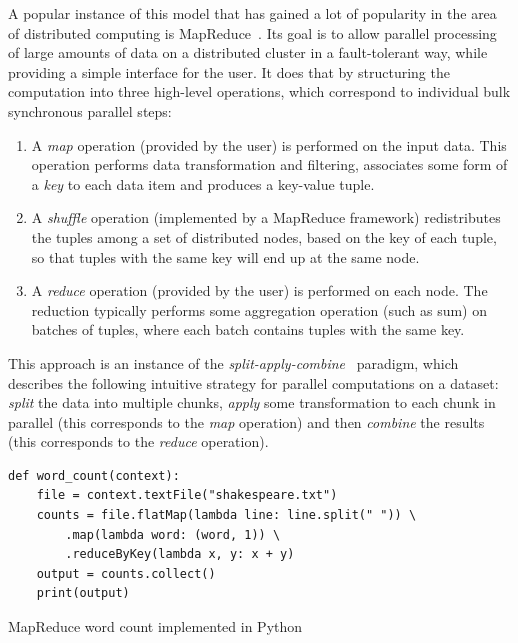 A popular instance of this model that has gained a lot of popularity in the area of distributed
computing is MapReduce~\cite{mapreduce}. Its goal is to allow parallel processing of large
amounts of data on a distributed cluster in a fault-tolerant way, while providing a simple
interface for the user. It does that by structuring the computation into three high-level
operations, which correspond to individual bulk synchronous parallel steps:
\begin{enumerate}
	\item A \emph{map} operation (provided by the user) is performed on the input data. This
	      operation performs data transformation and filtering, associates some form of a
	      \emph{key} to each data item and produces a key-value tuple.
	\item A \emph{shuffle} operation (implemented by a MapReduce framework) redistributes the tuples
	      among a set of distributed nodes, based on the key of each tuple, so that tuples with the same key
	      will end up at the same node.
	\item A \emph{reduce} operation (provided by the user) is performed on each node. The reduction
	      typically performs some aggregation operation (such as sum) on batches of tuples, where each batch
	      contains tuples with the same key.
\end{enumerate}

This approach is an instance of the \emph{split-apply-combine}~\cite{split_apply_combine} paradigm, which
describes the following intuitive strategy for parallel computations on a dataset:
\emph{split} the data into multiple chunks, \emph{apply} some transformation
to each chunk in parallel (this corresponds to the \emph{map} operation) and then
\emph{combine} the results (this corresponds to the \emph{reduce} operation).

\begin{listing}
	\begin{verbatim}
def word_count(context):
	file = context.textFile("shakespeare.txt")
	counts = file.flatMap(lambda line: line.split(" ")) \
		.map(lambda word: (word, 1)) \
		.reduceByKey(lambda x, y: x + y)
	output = counts.collect()
	print(output)
	\end{verbatim}
	\caption{MapReduce word count implemented in Python}
	\label{lst:wordcount-example}
\end{listing}

